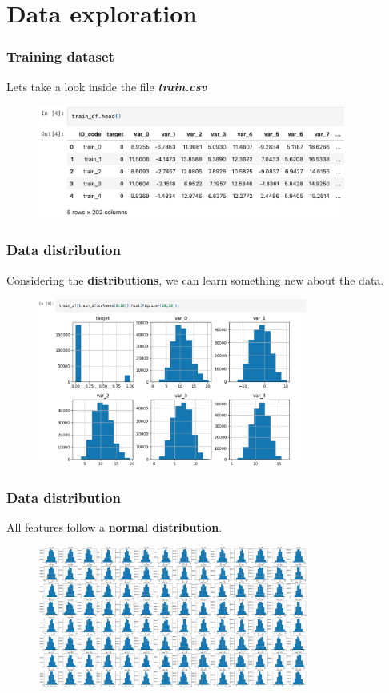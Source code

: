 \documentclass{beamer}
\begin{document}

\section{Data exploration}

\begin{frame}
\frametitle{Training dataset}
Lets take a look inside the file \textit{\textbf{train.csv}}
\begin{figure}
\centering
    \includegraphics[width=0.9\textwidth]{imgs/training.png}
    \label{fig:training}
\end{figure}
\end{frame}

\begin{frame}
\frametitle{Data distribution}
Considering the \textbf{distributions}, we can learn something new about the data.
\begin{figure}
\centering
    \includegraphics[width=0.79\textwidth]{imgs/distribution.png}
    \label{fig:distribution}
\end{figure}
\end{frame}

\begin{frame}
\frametitle{Data distribution}
All features follow a \textbf{normal distribution}.
\begin{figure}
\centering
    \includegraphics[width=0.79\textwidth]{imgs/distribution_all.png}
    \label{fig:distribution_all}
\end{figure}
\end{frame}
\end{document}
